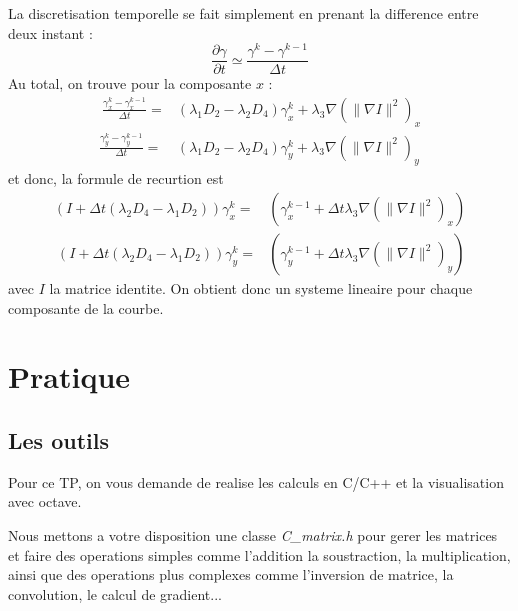 \documentclass[10pt,a4paper]{article}
\begin{document}
La discretisation temporelle se fait simplement en prenant la difference entre deux instant : 
\begin{displaymath}
	\frac{\partial \gamma}{\partial t} \simeq \frac{\gamma^{k}-\gamma^{k-1}}{\Delta t}
\end{displaymath}
Au total, on trouve pour la composante $x$ : 
\begin{eqnarray}~\label{discreteSnake}
	\frac{\gamma_{x}^{k}-\gamma_{x}^{k-1}}{\Delta t}=& (\lambda_1 D_2 -\lambda_2 D_4)\gamma_{x}^{k} + \lambda_3 \nabla(\|\nabla I\|^2)_{x}\\
	\frac{\gamma_{y}^{k}-\gamma_{y}^{k-1}}{\Delta t}=& (\lambda_1 D_2 -\lambda_2 D_4)\gamma_{y}^{k} + \lambda_3 \nabla(\|\nabla I\|^2)_{y}
\end{eqnarray}
et donc, la formule de recurtion est
\begin{eqnarray}\label{evolutionSnakex}
	(I+\Delta t (\lambda_2 D_4 - \lambda_1 D_2)) \gamma_{x}^{k} =&  (\gamma_{x}^{k-1} + \Delta t  \lambda_3 \nabla(\|\nabla I\|^2)_{x} )\\
~\label{evolutionSnakey}
	(I+\Delta t (\lambda_2 D_4 - \lambda_1 D_2)) \gamma_{y}^{k} =&  (\gamma_{y}^{k-1} + \Delta t  \lambda_3 \nabla(\|\nabla I\|^2)_{y} )
\end{eqnarray}
avec $I$ la matrice identite. On obtient donc un systeme lineaire pour chaque composante de la courbe.



\clearpage
\section{Pratique}
\subsection{Les outils}
Pour ce TP, on vous demande de realise les calculs en C/C++ et la visualisation avec octave. 

Nous mettons a votre disposition une classe \textit{C\_matrix.h} pour gerer les matrices et faire des operations simples comme l'addition la soustraction, la multiplication, ainsi que des operations plus complexes comme l'inversion de matrice, la convolution, le calcul de gradient...
\end{document}
